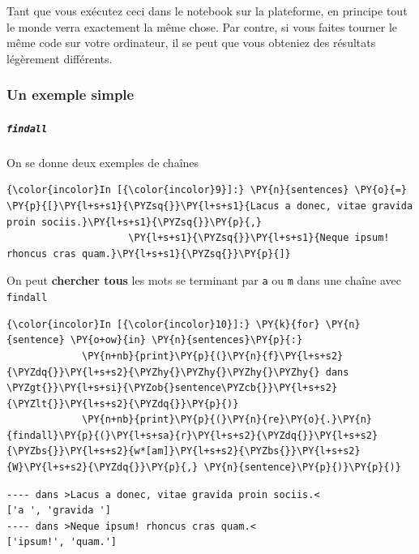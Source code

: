 Tant que vous exécutez ceci dans le notebook sur la plateforme, en
principe tout le monde verra exactement la même chose. Par contre, si
vous faites tourner le même code sur votre ordinateur, il se peut que
vous obteniez des résultats légèrement différents.

    \hypertarget{un-exemple-simple}{%
\subsubsection{Un exemple simple}\label{un-exemple-simple}}

    \hypertarget{findall}{%
\subparagraph{\texorpdfstring{\texttt{findall}}{findall}}\label{findall}}

    On se donne deux exemples de chaînes

    \begin{Verbatim}[commandchars=\\\{\}]
{\color{incolor}In [{\color{incolor}9}]:} \PY{n}{sentences} \PY{o}{=} \PY{p}{[}\PY{l+s+s1}{\PYZsq{}}\PY{l+s+s1}{Lacus a donec, vitae gravida proin sociis.}\PY{l+s+s1}{\PYZsq{}}\PY{p}{,} 
                     \PY{l+s+s1}{\PYZsq{}}\PY{l+s+s1}{Neque ipsum! rhoncus cras quam.}\PY{l+s+s1}{\PYZsq{}}\PY{p}{]}
\end{Verbatim}


    On peut \textbf{chercher tous} les mots se terminant par \texttt{a} ou
\texttt{m} dans une chaîne avec \texttt{findall}

    \begin{Verbatim}[commandchars=\\\{\}]
{\color{incolor}In [{\color{incolor}10}]:} \PY{k}{for} \PY{n}{sentence} \PY{o+ow}{in} \PY{n}{sentences}\PY{p}{:}
             \PY{n+nb}{print}\PY{p}{(}\PY{n}{f}\PY{l+s+s2}{\PYZdq{}}\PY{l+s+s2}{\PYZhy{}\PYZhy{}\PYZhy{}\PYZhy{} dans \PYZgt{}}\PY{l+s+si}{\PYZob{}sentence\PYZcb{}}\PY{l+s+s2}{\PYZlt{}}\PY{l+s+s2}{\PYZdq{}}\PY{p}{)}
             \PY{n+nb}{print}\PY{p}{(}\PY{n}{re}\PY{o}{.}\PY{n}{findall}\PY{p}{(}\PY{l+s+sa}{r}\PY{l+s+s2}{\PYZdq{}}\PY{l+s+s2}{\PYZbs{}}\PY{l+s+s2}{w*[am]}\PY{l+s+s2}{\PYZbs{}}\PY{l+s+s2}{W}\PY{l+s+s2}{\PYZdq{}}\PY{p}{,} \PY{n}{sentence}\PY{p}{)}\PY{p}{)}
\end{Verbatim}


    \begin{Verbatim}[commandchars=\\\{\}]
---- dans >Lacus a donec, vitae gravida proin sociis.<
['a ', 'gravida ']
---- dans >Neque ipsum! rhoncus cras quam.<
['ipsum!', 'quam.']

    \end{Verbatim}

